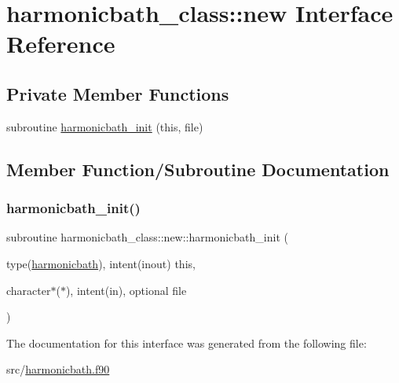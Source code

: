 \hypertarget{interfaceharmonicbath__class_1_1new}{}\section{harmonicbath\+\_\+class\+:\+:new Interface Reference}
\label{interfaceharmonicbath__class_1_1new}
\subsection*{Private Member Functions}
\begin{DoxyCompactItemize}
\item 
subroutine \hyperlink{interfaceharmonicbath__class_1_1new_a5dc95bde17c170a4ec836e461dff7050}{harmonicbath\+\_\+init} (this, file)
\end{DoxyCompactItemize}


\subsection{Member Function/\+Subroutine Documentation}
\mbox{\label{interfaceharmonicbath__class_1_1new_a5dc95bde17c170a4ec836e461dff7050}} 
\subsubsection{\texorpdfstring{harmonicbath\+\_\+init()}{harmonicbath\_init()}}
{\footnotesize\ttfamily subroutine harmonicbath\+\_\+class\+::new\+::harmonicbath\+\_\+init (\begin{DoxyParamCaption}\item[{type(\hyperlink{structharmonicbath__class_1_1harmonicbath}{harmonicbath}), intent(inout)}]{this,  }\item[{character$\ast$($\ast$), intent(in), optional}]{file }\end{DoxyParamCaption})\hspace{0.3cm}{\ttfamily [private]}}



The documentation for this interface was generated from the following file\+:\begin{DoxyCompactItemize}
\item 
src/\hyperlink{harmonicbath_8f90}{harmonicbath.\+f90}\end{DoxyCompactItemize}
